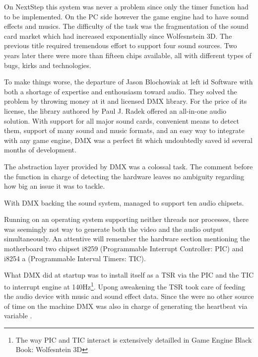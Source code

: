 On NextStep this system was never a problem since only the timer function had to be implemented. On the PC side however the game engine had to have sound effects and musics. The difficulty of the task was the fragmentation of the sound card market which had increased exponentially since Wolfesnstein 3D. The previous title required tremendous effort to support four sound sources. Two years later there were more than fifteen chips available, all with different types of bugs, kirks and technologies.\\
\par
To make things worse, the departure of Jason Blochowiak  at left id Software with both a shortage of expertise and enthousiasm toward audio. They solved the problem by throwing money at it and licensed DMX library. For the price of its license, the library authored by Paul J. Radek offered an all-in-one audio solution. With support for all major sound cards, convenient means to detect them, support of many sound and music formats, and an easy way to integrate with any game engine, DMX was a perfect fit which undoubtedly saved id several months of development.\\
\par
The abstraction layer provided by DMX was a colossal task. The comment before the function in charge of detecting the hardware leaves no ambiguity regarding how big an issue it was to tackle.\\
\par
{}
\par
With DMX backing the sound system, \doom managed to support ten audio chipsets.\\
\par
{}
\par
Running on an operating system supporting neither threads nor processes, there was seemingly not way to generate both the video and the audio output simultaneously. An attentive will remember the hardware section mentioning the motherboard two chipset i8259 (Programmable Interrupt Controller: PIC) and i8254 a (Programmable Interval Timers: TIC).\\
\par
What DMX did at startup was to install itself as a TSR via the PIC and the TIC to interrupt \doom engine at 140Hz\footnote{The way PIC and TIC interact is extensively detailled in Game Engine Black Book: Wolfesntein 3D}. Upong aweakening the TSR took care of feeding the audio device with music and sound effect data. Since the were no other source of time on the machine DMX was also in charge of generating the heartbeat via variable .
\par


